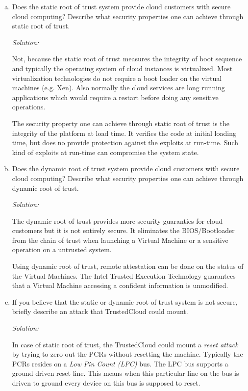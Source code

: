 \documentclass[a4paper,11pt]{article}
\newenvironment{solution}%
{\par{\noindent\small\textit{Solution:}}\vspace{-12pt}\begin{framed}}%
{\end{framed}\par}
\begin{document}
\begin{enumerate}[(a)]

\item Does the static root of trust system provide cloud customers with secure
cloud computing? Describe what security properties one can achieve through
static root of trust.

\ifsolution
\begin{solution}
Not, because the static root of trust measures the integrity of boot sequence and typically 
the operating system of cloud instances is virtualized. Most virtualization technologies 
do not require a boot loader on the virtual machines (e.g. Xen). Also normally the cloud 
services are long running applications which would require a restart before doing any sensitive 
operations.

The security property one can achieve through static root of trust is the integrity of the 
platform at load time. It verifies the code at initial loading time, but does no provide
protection against the exploits at run-time. Such kind of exploits at run-time can compromise 
the system state.    
\end{solution}\fi

\item Does the dynamic root of trust system provide cloud customers with secure
cloud computing? Describe what security properties one can achieve through
dynamic root of trust.

\ifsolution\begin{solution}
The dynamic root of trust provides more security guaranties for cloud customers but it
is not entirely secure. It eliminates the BIOS/Bootloader from the chain of trust when 
launching a Virtual Machine or a sensitive operation on a untrusted system. 

Using dynamic root of trust, remote attestation can be done on the status of the 
Virtual Machines. The Intel Trusted Execution Technology guarantees that a Virtual 
Machine accessing a confident information is unmodified.  
\end{solution}\fi

\item If you believe that the static or dynamic root of trust system is not
secure, briefly describe an attack that TrustedCloud could mount.

\ifsolution\begin{solution}
In case of static root of trust, the TrustedCloud could mount a \emph{reset attack} by trying to zero out
the PCRs without resetting the machine. Typically the PCRs resides on a \emph{Low Pin Count (LPC)} bus. The
LPC bus supports a ground driven reset line. This means when this particular line on the bus is driven to ground 
every device on this bus is supposed to reset. 


\end{solution}
\end{enumerate}
\end{document}
